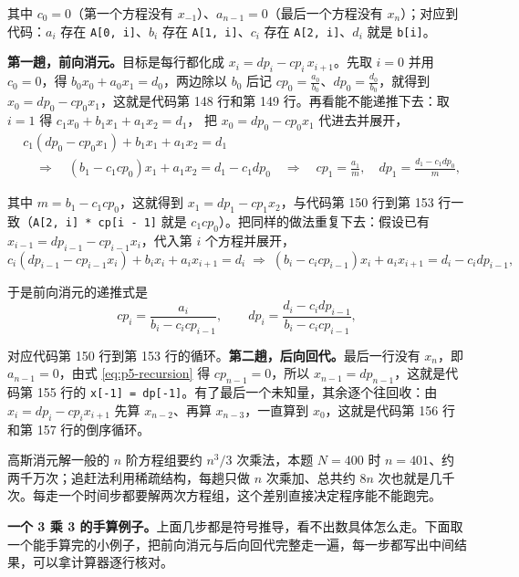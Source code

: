 其中 $c_0=0$（第一个方程没有 $x_{-1}$）、$a_{n-1}=0$（最后一个方程没有 $x_n$）；对应到代码：$a_i$ 存在 \texttt{A[0, i]}、$b_i$ 存在 \texttt{A[1, i]}、$c_i$ 存在 \texttt{A[2, i]}、$d_i$ 就是 \texttt{b[i]}。

\textbf{第一趟，前向消元。}目标是每行都化成 $x_i=dp_i-cp_i\,x_{i+1}$。先取 $i=0$ 并用 $c_0=0$，得 $b_0x_0+a_0x_1=d_0$，两边除以 $b_0$ 后记 $cp_0=\frac{a_0}{b_0}$、$dp_0=\frac{d_0}{b_0}$，就得到 $x_0=dp_0-cp_0x_1$，这就是代码第 148 行和第 149 行。再看能不能递推下去：取 $i=1$ 得 $c_1x_0+b_1x_1+a_1x_2=d_1$，
把 $x_0=dp_0-cp_0x_1$ 代进去并展开，
\begin{equation}
\begin{aligned}
&c_1\left(dp_0-cp_0x_1\right)+b_1x_1+a_1x_2=d_1\\
&\quad\Longrightarrow\quad
\left(b_1-c_1cp_0\right)x_1+a_1x_2=d_1-c_1dp_0
\quad\Longrightarrow\quad
cp_1=\frac{a_1}{m},\quad dp_1=\frac{d_1-c_1dp_0}{m},
\end{aligned}
\end{equation}

其中 $m=b_1-c_1cp_0$，这就得到 $x_1=dp_1-cp_1x_2$，与代码第 150 行到第 153 行一致（\texttt{A[2, i] * cp[i - 1]} 就是 $c_1cp_0$）。把同样的做法重复下去：假设已有 $x_{i-1}=dp_{i-1}-cp_{i-1}x_i$，代入第 $i$ 个方程并展开，
\begin{equation}
c_i\left(dp_{i-1}-cp_{i-1}x_i\right)+b_ix_i+a_ix_{i+1}=d_i
\;\Longrightarrow\;
\left(b_i-c_icp_{i-1}\right)x_i+a_ix_{i+1}=d_i-c_idp_{i-1},
\end{equation}

于是前向消元的递推式是
\begin{equation}
cp_i=\frac{a_i}{b_i-c_icp_{i-1}},\qquad
dp_i=\frac{d_i-c_idp_{i-1}}{b_i-c_icp_{i-1}},
\label{eq:p5-recursion}
\end{equation}

对应代码第 150 行到第 153 行的循环。\textbf{第二趟，后向回代。}最后一行没有 $x_n$，即 $a_{n-1}=0$，由式 \eqref{eq:p5-recursion} 得 $cp_{n-1}=0$，所以 $x_{n-1}=dp_{n-1}$，这就是代码第 155 行的 \texttt{x[-1] = dp[-1]}。有了最后一个未知量，其余逐个往回收：由 $x_i=dp_i-cp_ix_{i+1}$ 先算 $x_{n-2}$、再算 $x_{n-3}$，一直算到 $x_0$，这就是代码第 156 行和第 157 行的倒序循环。

高斯消元解一般的 $n$ 阶方程组要约 $n^3/3$ 次乘法，本题 $N=400$ 时 $n=401$、约两千万次；追赶法利用稀疏结构，每趟只做 $n$ 次乘加、总共约 $8n$ 次也就是几千次。每走一个时间步都要解两次方程组，这个差别直接决定程序能不能跑完。

\textbf{一个 3 乘 3 的手算例子。}上面几步都是符号推导，看不出数具体怎么走。下面取一个能手算完的小例子，把前向消元与后向回代完整走一遍，每一步都写出中间结果，可以拿计算器逐行核对。

